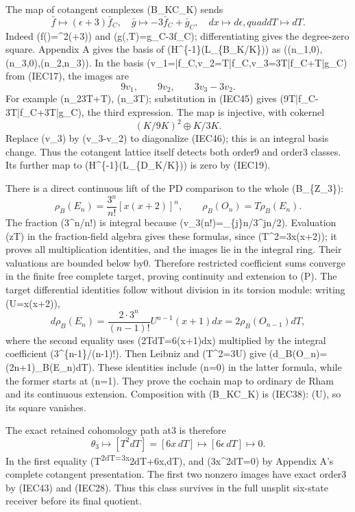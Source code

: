 \documentclass[
]{article}
\begin{document}
The map of cotangent complexes (B\_K\to C\_K) sends \[
\bar f\mapsto(\epsilon+3)\bar f_C,
\quad\bar g\mapsto-3\bar f_C+\bar g_C,
\quad dx\mapsto d\epsilon,quad dT\mapsto dT.
\tag{IEC45}
\] Indeed (f(\epsilon)=\epsilon\^{}2(\epsilon+3)) and
(g(\epsilon,T)=g\_C-3f\_C); differentiating gives the degree-zero
square. Appendix A gives the basis of (H\^{}\{-1\}(L\_\{B\_K/K\})) as
((n\_1,0),(n\_3,0),(n\_2,n\_3)). In the basis
(v\_1=\epsilon\bar f\_C,v\_2=\epsilon T\bar f\_C,v\_3=3T\bar f\_C+\epsilon T\bar g\_C)
from (IEC17), the images are \[
9v_1,\qquad9v_2,\qquad3v_3-3v_2.
\tag{IEC46}
\] For example (n\_2\mapsto3T+\epsilon T), (n\_3\epsilon T);
substitution in (IEC45) gives
(9T\bar f\_C-3\epsilon T\bar f\_C+3\epsilon T\bar g\_C), the third
expression. The map is injective, with cokernel \[
(K/9K)^2\oplus K/3K.
\tag{IEC47}
\] Replace (v\_3) by (v\_3-v\_2) to diagonalize (IEC46); this is an
integral basis change. Thus the cotangent lattice itself detects both
order9 and order3 classes. Its further map to
(H\^{}\{-1\}(L\_\{D\_K/K\})) is zero by (IEC19).

There is a direct continuous lift of the PD comparison to the whole
(B\_\{\mathbb Z\_3\}): \[
\rho_B(E_n)=\frac{3^n}{n!}[x(x+2)]^n,
\qquad \rho_B(O_n)=T\rho_B(E_n).
\tag{IEC48}
\] The fraction (3\^{}n/n!) is integral because
(v\_3(n!)=\sum\_\{j\}\lfloor n/3\^{}j\rfloor\le n/2). Evaluation
(z\mapsto T) in the fraction-field algebra gives these formulas, since
(T\^{}2=3x(x+2)); it proves all multiplication identities, and the
images lie in the integral ring. Their valuations are bounded below by0.
Therefore restricted coefficient sums converge in the finite free
complete target, proving continuity and extension to (\widehat P). The
target differential identities follow without division in its torsion
module: writing (U=x(x+2)), \[
d\rho_B(E_n)=\frac{2\cdot3^n}{(n-1)!}U^{n-1}(x+1)dx
=2\rho_B(O_{n-1})dT,
\tag{IEC49}
\] where the second equality uses (2TdT=6(x+1)dx) multiplied by the
integral coefficient (3\^{}\{n-1\}/(n-1)!). Then Leibniz and (T\^{}2=3U)
give (d\rho\_B(O\_n)=(2n+1)\rho\_B(E\_n)dT). These identities include
(n=0) in the latter formula, while the former starts at (n=1). They
prove the cochain map to ordinary de Rham and its continuous extension.
Composition with (B\_K\to C\_K) is (IEC38): (U\epsilon), so its
square vanishes.

The exact retained cohomology path at3 is therefore \[
\theta_3\longmapsto[T^2dT]=[6x\,dT]
\longmapsto[6\epsilon\,dT]\longmapsto0.
\tag{IEC50}
\] In the first equality (T\textsuperscript{2dT=3x}2dT+6x,dT), and
(3x\^{}2dT=0) by Appendix A's complete cotangent presentation. The first
two nonzero images have exact order3 by (IEC43) and (IEC28). Thus this
class survives in the full unsplit six-state receiver before its final
quotient.
\end{document}
